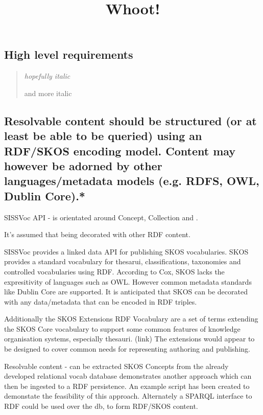 \documentclass[10pt,a4paper]{article}
\title{Whoot!}
\date{}
\newenvironment{italicquotes}
{\begin{quote}\itshape}
{\end{quote}}
\begin{document}
  \maketitle
    \begin{flushleft}
  \setlength{\parindent}{5ex}



\section{High level requirements}

\begin{italicquotes} hopefully italic  

  and more italic
  \end{italicquotes} 


\subsection{Resolvable content should be structured (or at least be able to be queried)
  using an RDF/SKOS encoding model. Content may however be adorned by other
  languages/metadata models (e.g. RDFS, OWL, Dublin Core).* }

  SISSVoc API - is orientated around Concept, Collection and .

  It's assumed that being decorated with other RDF content.
  

	SISSVoc provides a linked data API for publishing SKOS vocabularies.
  SKOS provides a standard vocabulary for thesarui, classifications, taxonomies
  and controlled vocabularies using RDF.
   According to Cox, SKOS lacks the expresitivity of languages such as OWL.
  However common metadata standards like Dublin Core are supported.
    It is anticipated that SKOS can be decorated with any data/metadata that can
  be encoded in RDF triples.


	Additionally the SKOS Extensions RDF Vocabulary are a set of terms extending
	the SKOS Core vocabulary to support some common features of knowledge
	organisation systems, especially thesauri. (link) The extensions would appear
	to be designed to cover common needs for representing authoring and publishing.

	Resolvable content - can be extracted SKOS Concepts from the already developed
	relational vocab database demonstrates another approach which can then be
	ingested to a RDF persistence. An example script has been created to demonstate
	the feasibility of this approach. Alternately a SPARQL interface to RDF could
	be used over the db, to form RDF/SKOS content.



\end{flushleft}
\end{document}
